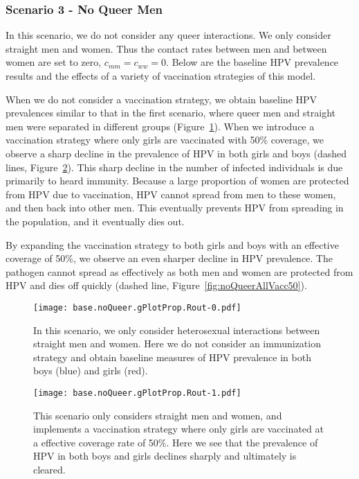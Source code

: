 \documentclass[12pt]{article}
\begin{document}
\newpage
\subsubsection{Scenario 3 - No Queer Men}

In this scenario, we do not consider any queer interactions.  We only consider straight men and women.  Thus the contact rates between men and between women are set to zero, $c_{mm} = c_{ww} = 0$.  Below are the baseline HPV prevalence results and the effects of a variety of vaccination strategies of this model. 

When we do not consider a vaccination strategy, we obtain baseline HPV prevalences similar to that in the first scenario, where queer men and straight men were separated in different groups (Figure~\ref{fig:noQueerNoVacc}).  When we introduce a vaccination strategy where only girls are vaccinated with 50\% coverage, we observe a sharp decline in the prevalence of HPV in both girls and boys (dashed lines, Figure~\ref{fig:noQueerGirlVacc50}).  This sharp decline in the number of infected individuals is due primarily to heard immunity.  Because a large proportion of women are protected from HPV due to vaccination, HPV cannot spread from men to these women, and then back into other men.  This eventually prevents HPV from spreading in the population, and it eventually dies out. 

By expanding the vaccination strategy to both girls and boys with an effective coverage of 50\%, we observe an even sharper decline in HPV prevalence.  The pathogen cannot spread as effectively as both men and women are protected from HPV and dies off quickly (dashed line, Figure~\ref{fig:noQueerAllVacc50}).

\begin{figure}[h!]
\begin{center}
\texttt{[image: base.noQueer.gPlotProp.Rout-0.pdf]}
\caption{In this scenario, we only consider heterosexual interactions between straight men and women.  Here we do not consider an immunization strategy and obtain baseline measures of HPV prevalence in both boys (blue) and girls (red).}
\label{fig:noQueerNoVacc}
\end{center}
\end{figure}

\begin{figure}[h!]
\begin{center}
\texttt{[image: base.noQueer.gPlotProp.Rout-1.pdf]}
\caption{This scenario only considers straight men and women, and implements a vaccination strategy where only girls are vaccinated at a effective coverage rate of 50\%.  Here we see that the prevalence of HPV in both boys and girls declines sharply and ultimately is cleared.}
\label{fig:noQueerGirlVacc50}
\end{center}
\end{figure}
\end{document}
